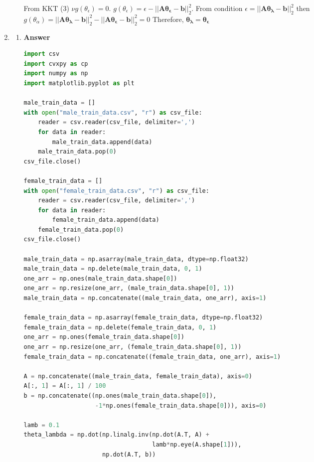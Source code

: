 \documentclass[11pt]{article}
\begin{document}
\begin{enumerate}[label=(\alph*)]
\begin{enumerate}[label=(\roman*)]
From KKT (3) $\nu g(\theta_\epsilon) = 0$.  $ g(\theta_\epsilon) =\epsilon - ||\mathbf{A\theta_\epsilon-b}||_2^2$. 
From condition $\epsilon =||\mathbf{A\theta_\lambda-b}||_2^2$ then  $ g(\theta_\alpha) = ||\mathbf{A\theta_\lambda-b}||_2^2-||\mathbf{A\theta_\epsilon-b}||_2^2 = 0$
Therefore, $\mathbf{\theta_\lambda} = \mathbf{\theta_\epsilon}$

\end{enumerate}

\item

\begin{enumerate}[label=(\roman*)]

\item \noindent\textbf{Answer}

\begin{lstlisting}[language=Python, showstringspaces=false]
import csv
import cvxpy as cp
import numpy as np
import matplotlib.pyplot as plt

male_train_data = []
with open("male_train_data.csv", "r") as csv_file:
    reader = csv.reader(csv_file, delimiter=',')
    for data in reader:
        male_train_data.append(data)
    male_train_data.pop(0)
csv_file.close()

female_train_data = []
with open("female_train_data.csv", "r") as csv_file:
    reader = csv.reader(csv_file, delimiter=',')
    for data in reader:
        female_train_data.append(data)
    female_train_data.pop(0)
csv_file.close()

male_train_data = np.asarray(male_train_data, dtype=np.float32)
male_train_data = np.delete(male_train_data, 0, 1)
one_arr = np.ones(male_train_data.shape[0])
one_arr = np.resize(one_arr, (male_train_data.shape[0], 1))
male_train_data = np.concatenate((male_train_data, one_arr), axis=1)

female_train_data = np.asarray(female_train_data, dtype=np.float32)
female_train_data = np.delete(female_train_data, 0, 1)
one_arr = np.ones(female_train_data.shape[0])
one_arr = np.resize(one_arr, (female_train_data.shape[0], 1))
female_train_data = np.concatenate((female_train_data, one_arr), axis=1)

A = np.concatenate((male_train_data, female_train_data), axis=0)
A[:, 1] = A[:, 1] / 100
b = np.concatenate((np.ones(male_train_data.shape[0]),
                    -1*np.ones(female_train_data.shape[0])), axis=0)

lamb = 0.1
theta_lambda = np.dot(np.linalg.inv(np.dot(A.T, A) +
                                    lamb*np.eye(A.shape[1])),
                      np.dot(A.T, b))


\end{lstlisting}
\end{enumerate}
\end{enumerate}
\end{document}

